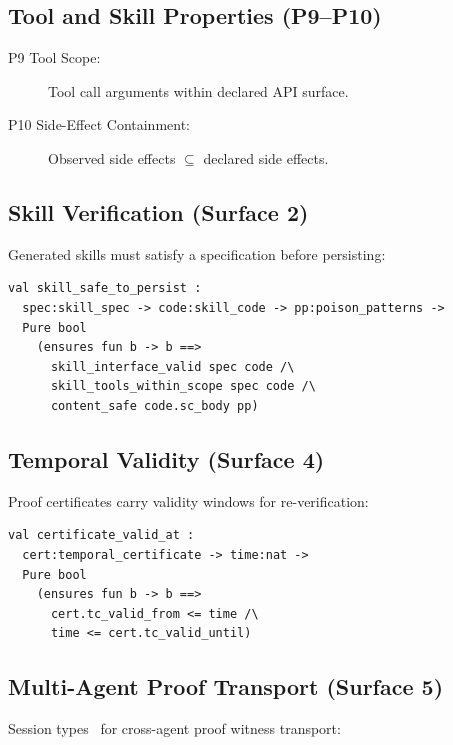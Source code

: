 \documentclass[sigplan,screen,nonacm]{acmart}
\begin{document}
\subsection{Tool and Skill Properties (P9--P10)}

\begin{description}
  \item[P9 Tool Scope:] Tool call arguments within declared API surface.
  \item[P10 Side-Effect Containment:] Observed side effects $\subseteq$
    declared side effects.
\end{description}

\subsection{Skill Verification (Surface 2)}

Generated skills must satisfy a specification before persisting:

\begin{lstlisting}[language=fstar,caption={Skill safety predicate composing interface, scope, and content checks.},label={lst:skill}]
val skill_safe_to_persist :
  spec:skill_spec -> code:skill_code -> pp:poison_patterns ->
  Pure bool
    (ensures fun b -> b ==>
      skill_interface_valid spec code /\
      skill_tools_within_scope spec code /\
      content_safe code.sc_body pp)
\end{lstlisting}

\subsection{Temporal Validity (Surface 4)}

Proof certificates carry validity windows for re-verification:

\begin{lstlisting}[language=fstar,caption={Temporal validity: certificates expire and must be re-verified.},label={lst:temporal}]
val certificate_valid_at :
  cert:temporal_certificate -> time:nat ->
  Pure bool
    (ensures fun b -> b ==>
      cert.tc_valid_from <= time /\
      time <= cert.tc_valid_until)
\end{lstlisting}

\subsection{Multi-Agent Proof Transport (Surface 5)}

Session types~\cite{gay2026session} for cross-agent proof witness transport:
\end{document}
